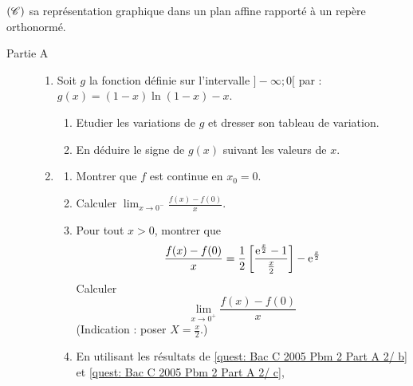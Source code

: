       $(\mathscr{C})$ sa repr\'esentation graphique dans un plan affine rapport\'e \`a un rep\`ere orthonorm\'e.
      \begin{description}
            \item[Partie A]
                  \begin{enumerate}
                        \item Soit $g$ la fonction d\'efinie sur l'intervalle $]-\infty ; 0[$ par : 
                              $g(x) = (1-x) \ln (1-x) - x$.
                              \begin{enumerate}
                                    \item Etudier les variations de $g$ et dresser son tableau de variation.
                                    \item En d\'eduire le signe de $g(x)$ suivant les valeurs de $x$.
                              \end{enumerate}
                        \item \begin{enumerate}
                                    \item Montrer que $f$ est continue en $x_0 = 0$.
                                    \item Calculer $\displaystyle{ \lim_{x\rightarrow 0^-} \frac{f(x) - f(0)}{x} }$.
                                          \label{quest: Bac C 2005 Pbm 2 Part A 2/ b}
                                    \item Pour tout $x > 0$, montrer que
                                          \[
                                                \frac{f(x) - f(0)}{x} = 
                                                \frac{1}{2}
                                                \left[ \frac{ \mathrm{e}^{\frac{x}{2}}-1 }{ \frac{x}{2}} \right] -
                                                \mathrm{e}^{\frac{x}{2}}
                                          \]
                                          Calculer 
                                          \[
                                          \lim_{x\rightarrow 0^+ } \frac{f(x) - f(0)}{x}
                                          \]
                                          (Indication : poser $X = \frac{x}{2}$.)
                                          \label{quest: Bac C 2005 Pbm 2 Part A 2/ c}
                                    \item En utilisant les r\'esultats de 
                                          \ref{quest: Bac C 2005 Pbm 2 Part A 2/ b} et \ref{quest: Bac C 2005 Pbm 2 Part A 2/ c},

\end{enumerate}
\end{enumerate}
\end{description}

